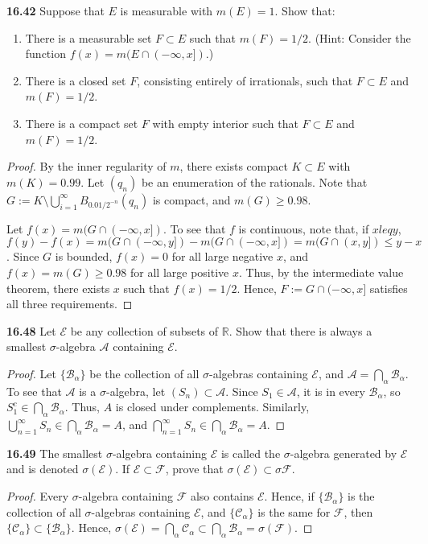 \documentclass{article}
\newcommand{\R}{\mathbb{R}}
\newcommand{\p}{\textbf}
\begin{document}
\p{16.42} Suppose that $E$ is measurable with $m(E) = 1$. Show that:
\begin{enumerate}
\item There is a measurable set $F \subset E$ such that $m(F) = 1/2$. (Hint: Consider the function $f(x) = m(E \cap (-\infty, x])$.)
\item There is a closed set $F$, consisting entirely of irrationals, such that $F \subset E$ and $m(F) = 1/2$.
\item There is a compact set $F$ with empty interior such that $F \subset E$ and $m(F) = 1/2$.
\end{enumerate}
\begin{proof}
By the inner regularity of $m$, there exists compact $K \subset E$ with $m(K) = 0.99$. Let $(q_n)$ be an enumeration of the rationals. Note that $G := K \setminus \bigcup_{i=1}^\infty B_{0.01/2^{-n}}(q_n)$ is compact, and $m(G) \geq 0.98$. 

Let $f(x) = m(G \cap (-\infty,x])$. To see that $f$ is continuous, note that, if $x leq y$, $f(y) - f(x) = m(G \cap (-\infty,y]) - m(G \cap (-\infty,x]) = m(G \cap (x,y]) \leq y-x$. Since $G$ is bounded, $f(x) = 0$ for all large negative $x$, and $f(x) = m(G) \geq 0.98$ for all large positive $x$. Thus, by the intermediate value theorem, there exists $x$ such that $f(x) = 1/2$.  Hence, $F:= G \cap (-\infty, x]$ satisfies all three requirements.

\end{proof}



\p{16.48} Let $\mathcal{E}$ be any collection of subsets of $\R$. Show that there is always a smallest $\sigma$-algebra $\mathcal{A}$ containing $\mathcal{E}$.
\begin{proof}
Let $\{\mathcal B_\alpha\}$ be the collection of all $\sigma$-algebras containing $\mathcal{E}$, and $\mathcal A = \bigcap_\alpha \mathcal B_\alpha$. To see that $\mathcal A$ is a $\sigma$-algebra, let $(S_n) \subset \mathcal A$. Since $S_1 \in \mathcal A$, it is in every $\mathcal B_\alpha$, so $S_1^c \in \bigcap_\alpha \mathcal B_\alpha$.  Thus, $A$ is closed under complements. Similarly, $\bigcup_{n=1}^\infty S_n \in \bigcap_\alpha \mathcal B_\alpha = A$, and $\bigcap_{n=1}^\infty S_n \in \bigcap_\alpha \mathcal B_\alpha = A$.
\end{proof}

\p{16.49} The smallest $\sigma$-algebra containing $\mathcal{E}$ is called the $\sigma$-algebra generated by $\mathcal{E}$ and is denoted $\sigma(\mathcal{E})$. If $\mathcal{E} \subset \mathcal{F}$, prove that $\sigma(\mathcal{E}) \subset \sigma{\mathcal{F}}$.
\begin{proof}
Every $\sigma$-algebra containing $\mathcal F$ also contains $\mathcal E$. Hence, if $\{\mathcal B_\alpha\}$ is the collection of all $\sigma$-algebras containing $\mathcal{E}$, and $\{\mathcal C_\alpha\}$ is the same for $\mathcal F$, then $\{\mathcal C_\alpha\} \subset \{\mathcal B_\alpha\}$.  Hence, $\sigma(\mathcal E) = \bigcap_\alpha \mathcal C_\alpha \subset \bigcap_\alpha \mathcal B_\alpha = \sigma(\mathcal F)$.
\end{proof}
\end{document}
